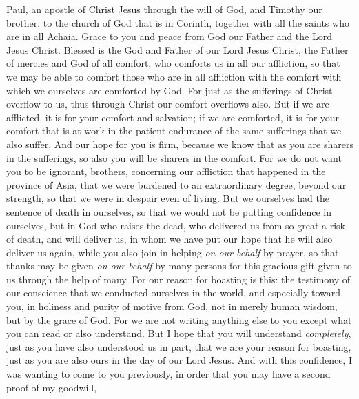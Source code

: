 
\begin{biblechapter} %
 Paul, an apostle of Christ Jesus through the will of God, and Timothy our brother, to the church of God that is in Corinth, together with all the saints who are in all Achaia.
\verse Grace to you and peace from God our Father and the Lord Jesus Christ.
 Blessed is the God and Father of our Lord Jesus Christ, the Father of mercies and God of all comfort,
\verse who comforts us in all our affliction, so that we may be able to comfort those who are in all affliction with the comfort with which we ourselves are comforted by God.
\verse For just as the sufferings of Christ overflow to us, thus through Christ our comfort overflows also.
\verse But if we are afflicted, it is for your comfort and salvation; if we are comforted, it is for your comfort that is at work in the patient endurance of the same sufferings that we also suffer.
\verse And our hope for you is firm, because we know that as you are sharers in the sufferings, so also you will be sharers in the comfort.
\verse For we do not want you to be ignorant, brothers, concerning our affliction that happened in the province of Asia, that we were burdened to an extraordinary degree, beyond our strength, so that we were in despair even of living.
\verse But we ourselves had the sentence of death in ourselves, so that we would not be putting confidence in ourselves, but in God who raises the dead,
\verse who delivered us from so great a risk of death, and will deliver us, in whom we have put our hope that he will also deliver us again,
\verse while you also join in helping \textit{on our behalf} by prayer, so that thanks may be given \textit{on our behalf} by many persons for this gracious gift given to us through the help of many.
 For our reason for boasting is this: the testimony of our conscience that we conducted ourselves in the world, and especially toward you, in holiness and purity of motive from God, not in merely human wisdom, but by the grace of God.
\verse For we are not writing anything else to you except what you can read or also understand. But I hope that you will understand \textit{completely},
\verse just as you have also understood us in part, that we are your reason for boasting, just as you are also ours in the day of our Lord Jesus.
 And with this confidence, I was wanting to come to you previously, in order that you may have a second proof of my goodwill,

\end{biblechapter}
